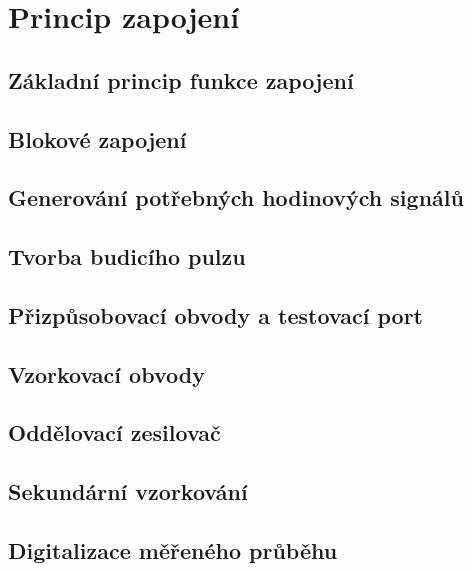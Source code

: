 \chapter{Princip zapojení}

\section{Základní princip funkce zapojení}

\section{Blokové zapojení}

\section{Generování potřebných hodinových signálů}

\section{Tvorba budicího pulzu}

\section{Přizpůsobovací obvody a testovací port}

\section{Vzorkovací obvody}

\section{Oddělovací zesilovač}

\section{Sekundární vzorkování}

\section{Digitalizace měřeného průběhu}